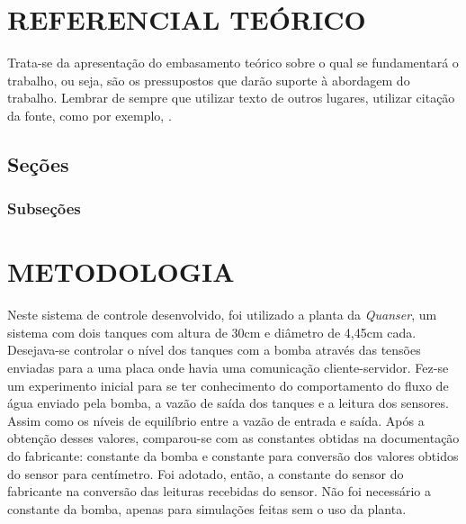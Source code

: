 \documentclass[a4paper,12pt]{article}
\begin{document}
\newpage


\thispagestyle{main}

\section{REFERENCIAL TEÓRICO}



Trata-se da apresentação do embasamento teórico sobre o qual se fundamentará
o trabalho, ou seja, são os pressupostos que darão suporte à abordagem do trabalho.
Lembrar de sempre que utilizar texto de outros lugares, utilizar citação da fonte, como por exemplo, \cite{LATEX04}.

\subsection{Seções}

\subsubsection{Subseções}

\newpage


\thispagestyle{main}

\section{METODOLOGIA}


\hspace{4ex}Neste sistema de controle desenvolvido, foi utilizado a planta da \textit{Quanser}, um sistema com dois tanques com altura de 30cm e diâmetro de 4,45cm cada. Desejava-se controlar o nível dos tanques com a bomba através das tensões enviadas para a uma placa onde havia uma comunicação cliente-servidor. Fez-se um experimento inicial para se ter conhecimento do comportamento do fluxo de água enviado pela bomba, a vazão de saída dos tanques e a leitura dos sensores. Assim como os níveis de equilíbrio entre a vazão de entrada e saída. Após a obtenção desses valores, comparou-se com as constantes obtidas na documentação do fabricante: constante da bomba e constante para conversão dos valores obtidos do sensor para centímetro. Foi adotado, então, a constante do  sensor do fabricante na conversão das leituras recebidas do sensor. Não foi necessário a constante da bomba, apenas para simulações feitas sem o uso da planta.
\end{document}
